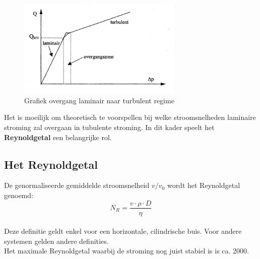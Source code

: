 \begin{figure}
    \caption{Grafiek overgang laminair naar turbulent regime}
    \label{fig:overgang_lam_turb}
    \includegraphics[width=0.7\textwidth]{img/figuur_3_theorie.png}
\end{figure}

Het is moeilijk om theoretisch te voorspellen bij welke stroomsnelheden laminaire
stroming zal overgaan in tubulente stroming. In dit kader speelt het 
\textbf{Reynoldgetal} een belangrijke rol.
\\

\subsection{Het Reynoldgetal}
De genormaliseerde gemiddelde stroomsnelheid $v/v_{0}$ wordt het Reynoldgetal genoemd:
\\

$$N_{R} = \frac{v \cdot \rho \cdot D}{\eta}$$
\\

Deze definitie geldt enkel voor een horizontale, cilindrische buis.
Voor andere systemen gelden andere definities.
\\

Het maximale Reynoldgetal waarbij de stroming nog juist stabiel is is ca. 2000.